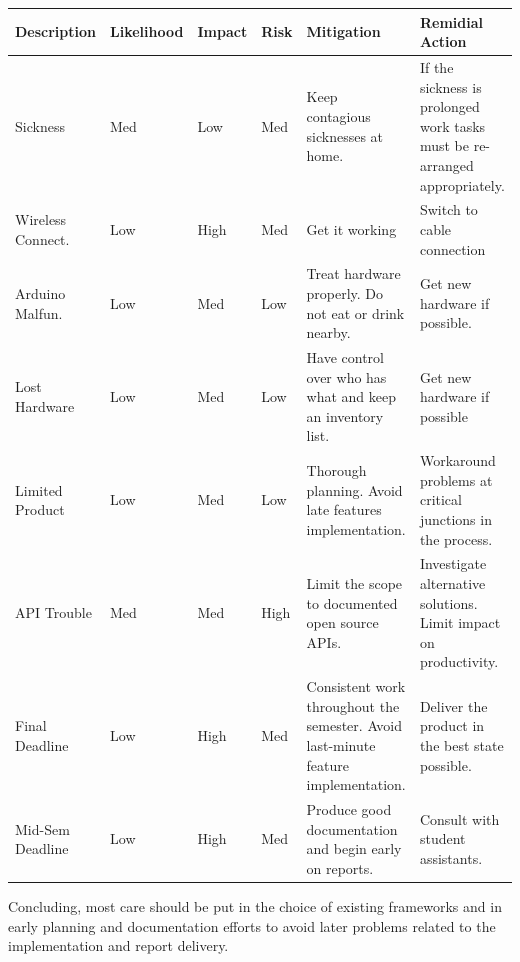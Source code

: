 \begin{center}
\begin{tabular}{| l | l | l | l | p{2.8cm} | p{2.8cm} |}
\hline

Description & Likelihood & Impact & Risk & Mitigation & Remidial Action\\ \hline

Sickness 			& Med & Low & Med & Keep contagious sicknesses at home.
					& If the sickness is prolonged work tasks must be re-arranged appropriately. \\

Wireless Connect. & Low & High & Med & Get it working & Switch to cable connection \\

Arduino Malfun. & Low & Med & Low & Treat hardware properly. Do not eat or drink nearby.
					&  Get new hardware if possible.\\

Lost Hardware & Low & Med & Low & Have control over who has what and keep an inventory list.
					& Get new hardware if possible \\

Limited Product & Low & Med & Low & Thorough planning. Avoid late features implementation.
					&  Workaround problems at critical junctions in the process.\\

API Trouble & Med & Med & High & Limit the scope to documented open source APIs.
			& Investigate alternative solutions. Limit impact on productivity. \\

Final Deadline & Low & High & Med & Consistent work throughout the semester. Avoid last-minute feature implementation.
			&  Deliver the product in the best state possible.\\
Mid-Sem Deadline & Low & High & Med & Produce good documentation and begin early on reports.
			&  Consult with student assistants.\\

\hline
\end{tabular}
\end{center}

Concluding, most care should be put in the choice of existing frameworks and in early planning
and documentation efforts to avoid later problems related to the implementation and report delivery.

